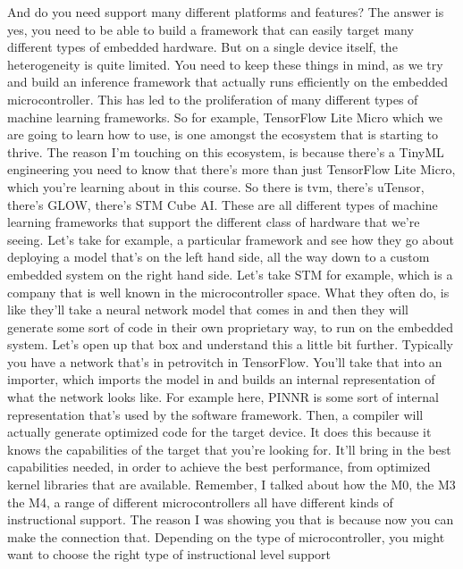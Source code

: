     And do you need support many different platforms and features?
    The answer is yes, you need to be able to build
    a framework that can easily target many different types of embedded hardware.
    But on a single device itself, the heterogeneity is quite limited.
    You need to keep these things in mind, as we try and build
    an inference framework that actually runs efficiently
    on the embedded microcontroller.
    This has led to the proliferation of many different types of machine
    learning frameworks.
    So for example, TensorFlow Lite Micro which we are going to learn how to use,
    is one amongst the ecosystem that is starting to thrive.
    The reason I'm touching on this ecosystem,
    is because there's a TinyML engineering you
    need to know that there's more than just TensorFlow Lite Micro, which
    you're learning about in this course.
    So there is tvm, there's uTensor, there's GLOW, there's STM Cube AI.
    These are all different types of machine learning frameworks
    that support the different class of hardware that we're seeing.
    Let's take for example, a particular framework
    and see how they go about deploying a model that's on the left hand side,
    all the way down to a custom embedded system on the right hand side.
    Let's take STM for example, which is a company that is well
    known in the microcontroller space.
    What they often do, is like they'll take a neural network model that comes in
    and then they will generate some sort of code in their own proprietary way,
    to run on the embedded system.
    Let's open up that box and understand this a little bit further.
    Typically you have a network that's in petrovitch in TensorFlow.
    You'll take that into an importer, which imports the model in and builds
    an internal representation of what the network looks like.
    For example here, PINNR is some sort of internal representation
    that's used by the software framework.
    Then, a compiler will actually generate optimized code for the target device.
    It does this because it knows the capabilities of the target
    that you're looking for.
    It'll bring in the best capabilities needed, in order
    to achieve the best performance, from optimized kernel
    libraries that are available.
    Remember, I talked about how the M0, the M3 the M4,
    a range of different microcontrollers all have different kinds
    of instructional support.
    The reason I was showing you that is because now you can make the connection
    that.
    Depending on the type of microcontroller,
    you might want to choose the right type of instructional level support
